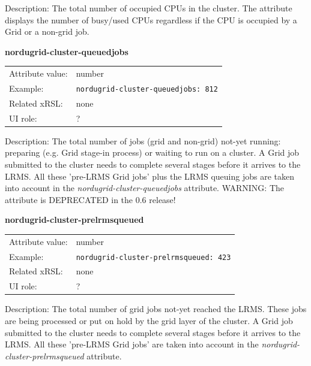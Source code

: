 \documentclass{article}
\begin{document}
Description: The total number of occupied CPUs in the cluster. 
The attribute displays the number of busy/used CPUs regardless 
if the CPU is occupied by a Grid or a non-grid job.


  \hspace*{0.5cm}
  \begin{shaded}
    \textbf{nordugrid-cluster-queuedjobs}
  \end{shaded}
  \begin{tabular}{lp{10cm}}  
    Attribute value:& number\\
    Example:& \verb#nordugrid-cluster-queuedjobs: 812#\\
    Related xRSL:& none\\
    UI role:& ?\\
  \end{tabular}

Description: The total number of jobs (grid and non-grid) not-yet running: preparing
(e.g. Grid stage-in process) or waiting to run on a cluster. 
A Grid job submitted to the cluster needs to complete several stages before 
it arrives to the LRMS. All these 'pre-LRMS Grid jobs' plus the LRMS queuing jobs 
are taken into account in the {\it nordugrid-cluster-queuedjobs} attribute.
WARNING: The attribute is DEPRECATED in the 0.6 release!

  \hspace*{0.5cm}
  \begin{shaded}
    \textbf{nordugrid-cluster-prelrmsqueued}
  \end{shaded}
  \begin{tabular}{lp{10cm}}  
    Attribute value:& number\\
    Example:& \verb#nordugrid-cluster-prelrmsqueued: 423#\\
    Related xRSL:& none\\
    UI role:& ?\\
  \end{tabular}

Description: The total number of grid jobs not-yet reached the
LRMS. These jobs are being processed or put on hold by the grid layer
of the cluster. A Grid job submitted to the cluster needs to complete several 
stages before it arrives to the LRMS. All these 'pre-LRMS Grid jobs' 
are taken into account in the {\it nordugrid-cluster-prelrmsqueued} attribute.
\end{document}
